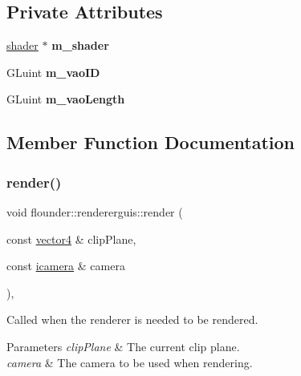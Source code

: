 \subsection*{Private Attributes}
\begin{DoxyCompactItemize}
\item 
\mbox{\label{classflounder_1_1rendererguis_ae201eb0e348ba4c4a5602cfc598c8793}} 
\hyperlink{classflounder_1_1shader}{shader} $\ast$ {\bfseries m\+\_\+shader}
\item 
\mbox{\label{classflounder_1_1rendererguis_a4555d233f796a2dfb9118a35bc146359}} 
G\+Luint {\bfseries m\+\_\+vao\+ID}
\item 
\mbox{\label{classflounder_1_1rendererguis_a975c33993f60ef3e8ac88d960cbac812}} 
G\+Luint {\bfseries m\+\_\+vao\+Length}
\end{DoxyCompactItemize}


\subsection{Member Function Documentation}
\mbox{\label{classflounder_1_1rendererguis_afdf543d9a5dfbe3c7fdd9d266dd34981}} 
\subsubsection{\texorpdfstring{render()}{render()}}
{\footnotesize\ttfamily void flounder\+::rendererguis\+::render (\begin{DoxyParamCaption}\item[{const \hyperlink{classflounder_1_1vector4}{vector4} \&}]{clip\+Plane,  }\item[{const \hyperlink{classflounder_1_1icamera}{icamera} \&}]{camera }\end{DoxyParamCaption})\hspace{0.3cm}{\ttfamily [override]}, {\ttfamily [virtual]}}



Called when the renderer is needed to be rendered. 


\begin{DoxyParams}{Parameters}
{\em clip\+Plane} & The current clip plane. \\
\hline
{\em camera} & The camera to be used when rendering. \\
\hline
\end{DoxyParams}


